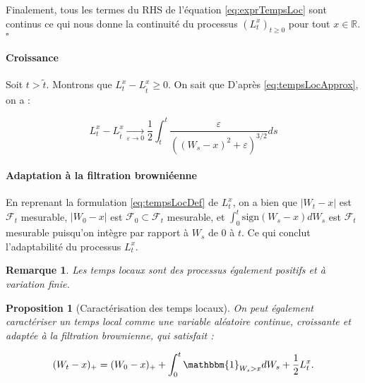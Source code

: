 \documentclass[openany]{book}
\makeatletter
\newcommand{\F}{\mathscr{F}}
\newcommand{\R}{\mathbb{R}}
\newcommand{\1}{\mathbbm{1}}
\newcommand{\sign}{\text{sign}}
\renewenvironment{proof}[1][\textbf{\textit{Démonstration}}]{%
  \par\pushQED{\qed}%
  \normalfont\topsep6\p@\@plus6\p@\relax
  \trivlist\item[\hskip\labelsep
    #1\@addpunct{.}]\ignorespaces
}{%
  \popQED\endtrivlist\@endpefalse
}
\theoremstyle{thmfont}
\theoremstyle{deffont}
\theoremstyle{thmfont}
\newtheorem{prop}[prop]{Proposition}
\theoremstyle{deffont}
\newtheorem*{remark}{Remarque}
\makeatother
\begin{document}
\begin{proof}
Finalement, tous les termes du RHS de l'équation \eqref{eq:exprTempsLoc} sont continus ce qui nous donne la continuité du processus $(L_t^x)_{t\geq0}$ pour tout $x \in \R$. \hfill $\square$

{\color{red}\paragraph{Croissance}
Soit $t > \tilde t$. Montrons que $L_t^x - L_{\tilde t}^x \geq 0$. On sait que  D'après \eqref{eq:tempsLocApprox}, on a :

$$L_t^x - L_{\tilde t}^x \xrightarrow[\varepsilon\to 0]{} \dfrac{1}{2} \int_{\tilde t}^t \dfrac{\varepsilon}{((W_s-x)^2 +\varepsilon)^{3/2}} ds$$
}

\paragraph{Adaptation à la filtration browniéenne}
En reprenant la formulation \eqref{eq:tempsLocDef} de $L_t^x$, on a bien que $|W_t -x|$ est $\F_t$ mesurable, $|W_0 -x|$ est $\F_0 \subset \F_t$ mesurable, et $\int_0^t\sign(W_s -x)dW_s$ est $\F_t$ mesurable puisqu'on intègre par rapport à $W_s$ de $0$ à $t$. Ce qui conclut l'adaptabilité du processus $L_t^x$.
\end{proof}


\begin{remark}
  Les temps locaux sont des processus également \textit{positifs} et à \textit{variation finie}.
\end{remark}

\begin{prop}[Caractérisation des temps locaux]
  On peut également caractériser un \textit{temps local} comme une variable aléatoire continue, croissante et adaptée à la filtration brownienne, qui satisfait :

  \begin{equation}
    (W_t - x)_+ = (W_0 - x)_+ + \int_0^t \1_{W_s > x}dW_s + \dfrac{1}{2}L_t^x.
  \end{equation}
  
\end{prop}
\end{document}
